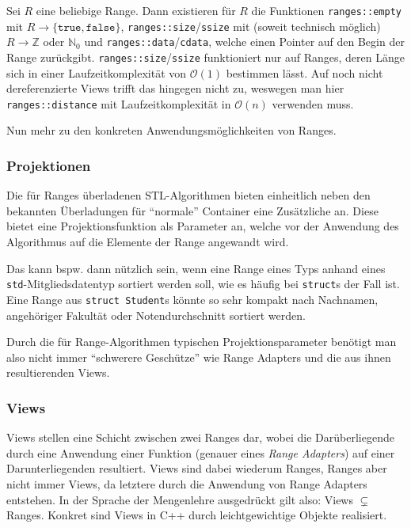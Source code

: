 \documentclass[runningheads]{llncs}
\begin{document}

Sei $R$ eine beliebige Range.
Dann existieren für $R$ die Funktionen \texttt{ranges::empty} mit $R\to\{\texttt{true},\texttt{false}\}$, \texttt{ranges::size}/\texttt{ssize} mit (soweit technisch möglich) $R\to\mathbb{Z}$ oder $\mathbb{N}_0$ und \texttt{ranges::data}/\texttt{cdata}, welche einen Pointer auf den Begin der Range zurückgibt.
\texttt{ranges::size}/\texttt{ssize} funktioniert nur auf Ranges, deren Länge sich in einer Laufzeitkomplexität von $\mathcal{O}(1)$ bestimmen lässt.
Auf noch nicht dereferenzierte Views trifft das hingegen nicht zu, weswegen man hier \texttt{ranges::distance} mit Laufzeitkomplexität in $\mathcal{O}(n)$ verwenden muss.

Nun mehr zu den konkreten Anwendungsmöglichkeiten von Ranges.

\subsubsection{Projektionen}

Die für Ranges überladenen STL-Algorithmen bieten einheitlich neben den bekannten Überladungen für \enquote{normale} Container eine Zusätzliche an.
Diese bietet eine Projektionsfunktion als Parameter an, welche vor der Anwendung des Algorithmus auf die Elemente der Range angewandt wird.

Das kann bspw. dann nützlich sein, wenn eine Range eines Typs anhand eines \texttt{std}-Mitgliedsdatentyp sortiert werden soll, wie es häufig bei \texttt{struct}s der Fall ist.
Eine Range aus \texttt{struct Student}s könnte so sehr kompakt nach Nachnamen, angehöriger Fakultät oder Notendurchschnitt sortiert werden.

Durch die für Range-Algorithmen typischen Projektionsparameter benötigt man also nicht immer \enquote{schwerere Geschütze} wie Range Adapters und die aus ihnen resultierenden Views.

\subsubsection{Views}

Views stellen eine Schicht zwischen zwei Ranges dar, wobei die Darüberliegende durch eine Anwendung einer Funktion (genauer eines \textit{Range Adapters}) auf einer Darunterliegenden resultiert.
Views sind dabei wiederum Ranges, Ranges aber nicht immer Views, da letztere durch die Anwendung von Range Adapters entstehen.
In der Sprache der Mengenlehre ausgedrückt gilt also: Views $\subsetneq$ Ranges.
Konkret sind Views in C++ durch leichtgewichtige Objekte realisiert.
\end{document}
